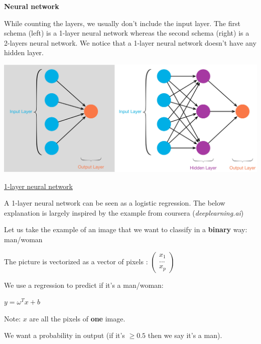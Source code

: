 {\fontsize{12pt}{22pt} \textbf{Neural network}\par}

\vspace{5mm}

While counting the layers, we usually don't include the input layer. The first schema (left) is a 1-layer neural network whereas the second schema (right) is a 2-layers neural network. We notice that a 1-layer neural network doesn't have any hidden layer.

\begin{center}
\includegraphics[scale=0.09]{nn-layers.jpeg}
\end{center}

\vspace{5mm}

\underline{1-layer neural network}

\vspace{5mm}

A 1-layer neural network can be seen as a logistic regression. The below explanation is largely inspired by  the example from coursera (\textit{deeplearning.ai})

Let us take the example of an image that we want to classify in a \textbf{binary} way: man/woman

The picture is vectorized as a vector of pixels : $\begin{pmatrix}x_1\\...\\x_p\end{pmatrix}$

We use a regression to predict if it's a man/woman:

$y=\omega^Tx + b$

Note: $x$ are all the pixels of \textbf{one} image.

\vspace{5mm}

We want a probability in output (if it's $\ge 0.5$ then we say it's a man).

